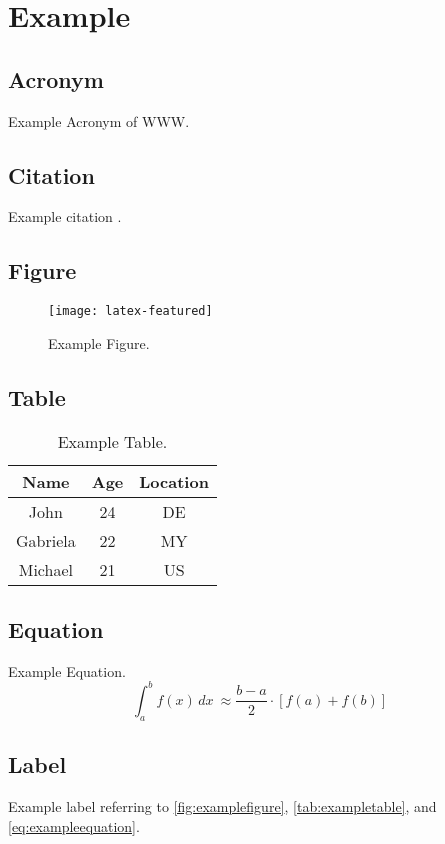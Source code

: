 \chapter{Example}

\section{Acronym}
Example Acronym of \ac{WWW}.

\section{Citation}

Example citation \cite{shannon1949communication}.

\section{Figure}

\begin{figure}
  \centering
  \texttt{[image: latex-featured]}
  \caption{Example Figure.}
  \label{fig:examplefigure}
\end{figure}

\section{Table}

\begin{table}
	\centering
	\caption{Example Table.}
	\label{tab:exampletable}
	\begin{tabular}{ccc}
		\toprule
		Name & Age & Location \\ \midrule
    John & 24 & DE \\
    Gabriela & 22 & MY \\
    Michael & 21 & US \\ \bottomrule
	\end{tabular}
\end{table}

\section{Equation}

Example Equation.
\begin{equation}
	\int_{a}^{b} f(x) \, dx\ \approx \frac{b - a}{2} \cdot [f(a) + f(b)]
	\label{eq:exampleequation}
\end{equation}

\section{Label}

Example label referring to \autoref{fig:examplefigure}, \autoref{tab:exampletable}, and \autoref{eq:exampleequation}.

